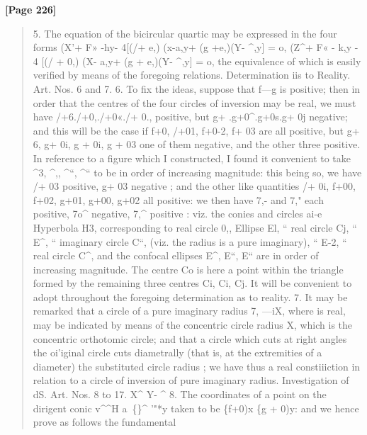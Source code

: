 \documentclass[11pt,a4paper]{book}
\begin{document}
\textbf{[Page 226]}\\[0.2cm]
\begin{quote}
5. The equation of the bicircular quartic may be expressed in the four forms
(X'+ F» -hy- 4[(/+ e,) (x-a,y+ (g +e,)(Y- \textasciicircum{},y] = o,
(Z\textasciicircum{}+ F« - k,y - 4 [(/ + 0,) (X- a,y+ (g + e,)(Y- \textasciicircum{},y] = o,
the equivalence of which is easily verified by means of the foregoing relations.
Determination iis to Reality. Art. Nos. 6 and 7.
6. To fix the ideas, suppose that f---g is positive; then in order that the centres
of the four circles of inversion may be real, we must have /+6./+0,./+0«./+ 0.,
positive, but g+ .g+0\textasciicircum{}.g+0s.g+ 0j negative; and this will be the case if f+0,
/+01, f+0-2, f+ 03 are all positive, but g+ 6, g+ 0i, g + 0i, g + 03 one of them
negative, and the other three positive. In reference to a figure which I constructed,
I found it convenient to take \textasciicircum{}3, \textasciicircum{},, \textasciicircum{}``, \textasciicircum{}`` to be in order of increasing magnitude:
this being so, we have /+ 03 positive, g+ 03 negative ; and the other like quantities
/+ 0i, f+00, f+02, g+01, g+00, g+02 all positive: we then have 7,- and 7," each
positive, 7o\textasciicircum{} negative, 7,\textasciicircum{} positive : viz. the conies and circles ai-e
Hyperbola H3, corresponding to real circle 0,,
Ellipse El, `` real circle Cj,
`` E\textasciicircum{}, `` imaginary circle C``,
(viz. the radius is a pure imaginary),
`` E-2, `` real circle C\textasciicircum{},
and the confocal ellipses E\textasciicircum{}, E``, E`` are in order of increasing magnitude. The
centre Co is here a point within the triangle formed by the remaining three centres
Ci, Ci, Cj. It will be convenient to adopt throughout the foregoing determination
as to reality.
7. It may be remarked that a circle of a pure imaginary radius 7, ---iX, where
 is real, may be indicated by means of the concentric circle radius X, which is the
concentric orthotomic circle; and that a circle which cuts at right angles the oi'iginal
circle cuts diametrally (that is, at the extremities of a diameter) the substituted
circle radius ; we have thus a real constiiiction in relation to a circle of inversion
of pure imaginary radius.
Investigation of dS. Art. Nos. 8 to 17.
X\textasciicircum{} Y- \textasciicircum{}
8. The coordinates of a point on the dirigent conic v\textasciicircum{}\textasciicircum{}H a~\{\}\textasciicircum{} '"*y
taken to be \{f+0)x \{g + 0)y: and we hence prove as follows the fundamental
\end{quote}
\end{document}
